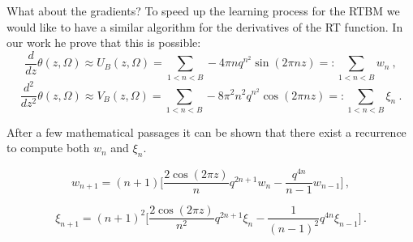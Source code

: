 \documentclass[10pt]{beamer}
\begin{document}
\begin{frame}{What about the gradients?}
    To speed up the learning process for the RTBM we would like to have a similar algorithm for the derivatives
    of the RT function. 
    In our work he prove that this is possible:
    \begin{equation*}
        \frac{d}{d z} \theta(z, \Omega) \approx U_B(z, \Omega) = \sum_{1 < n < B}  - 4 \pi n  q^{n^2} \sin(2 \pi n z) =:  \sum_{1 < n < B} w_n \ ,
   \end{equation*}
   \begin{equation*}
    \frac{d^2}{d z^2} \theta(z, \Omega) \approx V_B(z, \Omega) = \sum_{1 < n < B}  - 8 \pi^2 n^2 q^{n^2} \cos(2 \pi n z) =:  \sum_{1 < n < B} \xi_n \ .
   \end{equation*}

   After a few mathematical passages it can be shown that there exist a recurrence to compute both $w_n$ and $\xi_n$.


   \begin{equation*}
    w_{n+1} =  (n+1) \bigg[ \frac{2 \cos(2 \pi z)}{n} q^{2n + 1} w_n - 
    \frac{q^{4n}}{n-1} w_{n-1}\bigg]\,,
   \end{equation*}

   \begin{equation*}
        \xi_{n+1} = (n+1)^2 \bigg[ \frac{2 \cos( 2 \pi z)}{n^2} q^{2 n + 1} \xi_n 
        - \frac{1}{(n-1)^2}  q^{4n}\xi_{n-1} \bigg]\,.
   \end{equation*}

\end{frame}
\end{document}
